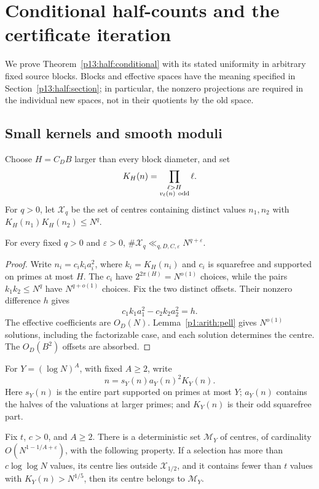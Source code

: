 \section{Conditional half-counts and the certificate iteration}
\label{p14:comp:half}

We prove Theorem~\ref{p13:half:conditional} with its stated uniformity
in arbitrary fixed source blocks.  Blocks and effective spaces have the
meaning specified in Section~\ref{p13:half:section}; in particular,
the nonzero projections are required in the individual new spaces,
not in their quotients by the old space.

\subsection{Small kernels and smooth moduli}

Choose \(H=C_DB\) larger than every block diameter, and set
\[
 K_H(n)=\prod_{\substack{\ell>H\\v_\ell(n)\ {\rm odd}}}\ell.
\]
For \(q>0\), let \(\mathcal X_q\) be the set of centres
containing distinct values \(n_1,n_2\) with
\(K_H(n_1)K_H(n_2)\le N^q\).

\begin{lemma}
\label{p13:half:small-kernels}
For every fixed \(q>0\) and \(\varepsilon>0\),
\(\#\mathcal X_q\ll_{q,D,C,\varepsilon}N^{q+\varepsilon}\).
\end{lemma}

\begin{proof}
Write \(n_i=c_i k_i a_i^2\), where \(k_i=K_H(n_i)\)
and \(c_i\) is squarefree and supported on primes at most \(H\).
The \(c_i\) have \(2^{2\pi(H)}=N^{o(1)}\) choices, while
the pairs \(k_1k_2\le N^q\) have \(N^{q+o(1)}\) choices.
Fix the two distinct offsets. Their nonzero difference \(h\)
gives
\[
 c_1k_1a_1^2-c_2k_2a_2^2=h.
\]
The effective coefficients are \(O_D(N)\).
Lemma~\ref{p1:arith:pell} gives \(N^{o(1)}\) solutions,
including the factorizable case, and each solution determines
the centre. The \(O_D(B^2)\) offsets are absorbed.
\end{proof}

For \(Y=(\log N)^A\), with fixed \(A\ge2\), write
\[
 n=s_Y(n)a_Y(n)^2K_Y(n).
\]
Here \(s_Y(n)\) is the entire part supported on primes at most
\(Y\); \(a_Y(n)\) contains the halves of the valuations at
larger primes; and \(K_Y(n)\) is their odd squarefree part.

\begin{lemma}
\label{p13:half:smooth}
Fix \(t\), \(c>0\), and \(A\ge2\).
There is a deterministic set \(\mathcal M_Y\) of centres,
of cardinality \(O(N^{1-1/A+\varepsilon})\), with the
following property. If a selection has more than
\(c\log\log N\) values, its centre lies outside
\(\mathcal X_{1/2}\), and it contains fewer than \(t\)
values with \(K_Y(n)>N^{1/5}\), then its centre belongs
to \(\mathcal M_Y\).
\end{lemma}


